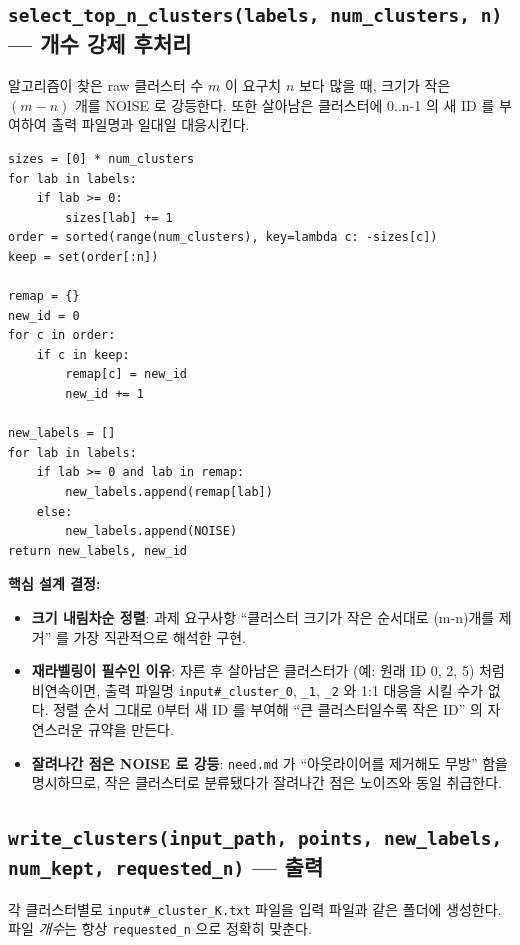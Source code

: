 \documentclass[12pt, a4paper]{article}
\begin{document}
\subsection{\texttt{select\_top\_n\_clusters(labels, num\_clusters, n)} --- 개수 강제 후처리}

알고리즘이 찾은 raw 클러스터 수 $m$ 이 요구치 $n$ 보다 많을 때, 크기가 작은 $(m-n)$ 개를 NOISE 로 강등한다. 또한 살아남은 클러스터에 0..n-1 의 새 ID 를 부여하여 출력 파일명과 일대일 대응시킨다.

\begin{verbatim}
sizes = [0] * num_clusters
for lab in labels:
    if lab >= 0:
        sizes[lab] += 1
order = sorted(range(num_clusters), key=lambda c: -sizes[c])
keep = set(order[:n])

remap = {}
new_id = 0
for c in order:
    if c in keep:
        remap[c] = new_id
        new_id += 1

new_labels = []
for lab in labels:
    if lab >= 0 and lab in remap:
        new_labels.append(remap[lab])
    else:
        new_labels.append(NOISE)
return new_labels, new_id
\end{verbatim}

\noindent\textbf{핵심 설계 결정:}
\begin{itemize}
    \item \textbf{크기 내림차순 정렬}: 과제 요구사항 ``클러스터 크기가 작은 순서대로 (m-n)개를 제거'' 를 가장 직관적으로 해석한 구현.
    \item \textbf{재라벨링이 필수인 이유}: 자른 후 살아남은 클러스터가 (예: 원래 ID 0, 2, 5) 처럼 비연속이면, 출력 파일명 \texttt{input\#\_cluster\_0}, \texttt{\_1}, \texttt{\_2} 와 1:1 대응을 시킬 수가 없다. 정렬 순서 그대로 0부터 새 ID 를 부여해 ``큰 클러스터일수록 작은 ID'' 의 자연스러운 규약을 만든다.
    \item \textbf{잘려나간 점은 NOISE 로 강등}: \texttt{need.md} 가 ``아웃라이어를 제거해도 무방'' 함을 명시하므로, 작은 클러스터로 분류됐다가 잘려나간 점은 노이즈와 동일 취급한다.
\end{itemize}


\subsection{\texttt{write\_clusters(input\_path, points, new\_labels, num\_kept, requested\_n)} --- 출력}

각 클러스터별로 \texttt{input\#\_cluster\_K.txt} 파일을 입력 파일과 같은 폴더에 생성한다. 파일 \emph{개수}는 항상 \texttt{requested\_n} 으로 정확히 맞춘다.
\end{document}
